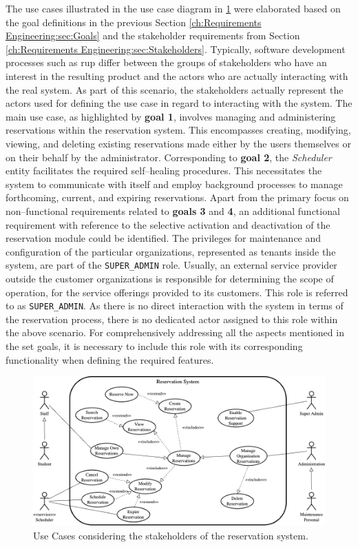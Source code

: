 The use cases illustrated in the use case diagram in \ref{fig:use-cases} were elaborated based on the goal definitions in the previous Section \ref{ch:Requirements Engineering:sec:Goals} and the stakeholder requirements from Section \ref{ch:Requirements Engineering:sec:Stakeholders}.
Typically, software development processes such as \acrshort{rup} \cite{kruchten_rational_1999} differ between the groups of stakeholders who have an interest in the resulting product and the actors who are actually interacting with the real system. 
As part of this scenario, the stakeholders actually represent the actors used for defining the use case in regard to interacting with the system.
The main use case, as highlighted by \textbf{goal 1}, involves managing and administering reservations within the reservation system. This encompasses creating, modifying, viewing, and deleting existing reservations made either by the users themselves or on their behalf by the administrator.
Corresponding to \textbf{goal 2}, the \textit{Scheduler} entity facilitates the required self--healing procedures. This necessitates the system to communicate with itself and employ background processes to manage forthcoming, current, and expiring reservations.
Apart from the primary focus on non--functional requirements related to \textbf{goals 3} and \textbf{4}, an additional functional requirement with reference to the selective activation and deactivation of the reservation module could be identified.
The privileges for maintenance and configuration of the particular organizations, represented as tenants inside the system, are part of the \verb|SUPER_ADMIN| role.
Usually, an external service provider outside the customer organizations is responsible for determining the scope of operation, for the service offerings provided to its customers. This role is referred to as \verb|SUPER_ADMIN|. As there is no direct interaction with the system in terms of the reservation process, there is no dedicated actor assigned to this role within the above scenario.
For comprehensively addressing all the aspects mentioned in the set goals, it is necessary to include this role with its corresponding functionality when defining the required features.

\begin{figure}[h]
    \centering
    \includegraphics[scale=0.4]{resources/images/main/2_requirements_engineering/UseCases.png}
    \caption{Use Cases considering the stakeholders of the reservation system.}
    \label{fig:use-cases}
\end{figure}
